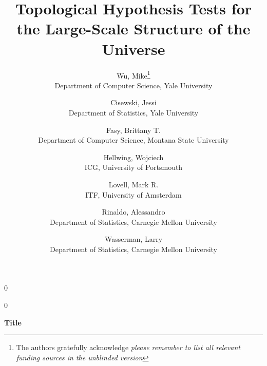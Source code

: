 \documentclass[12pt]{article}
\newcommand{\blind}{0}
\begin{document}
%

\def\spacingset#1{\renewcommand{\baselinestretch}%
{#1}\small\normalsize} \spacingset{1}



\blind
{
  \title{\bf Topological Hypothesis Tests for the Large-Scale Structure of the Universe}
  \author{Wu, Mike\thanks{
    The authors gratefully acknowledge \textit{please remember to list all relevant funding sources in the unblinded version}}\hspace{.2cm}\\
    Department of Computer Science, Yale University
    \and
    Cisewski, Jessi\\
    Department of Statistics, Yale University
    \and
    Fasy, Brittany T.\\
    Department of Computer Science, Montana State University
    \and
    Hellwing, Wojciech\\
    ICG, University of Portsmouth
    \and
    Lovell, Mark R.\\
    ITF, University of Amsterdam
    \and
    Rinaldo, Alessandro\\
    Department of Statistics, Carnegie Mellon University
    \and
    Wasserman, Larry\\
    Department of Statistics, Carnegie Mellon University
  }
  \maketitle
} \fi

\blind
{
  \bigskip
  \bigskip
  \bigskip
  \begin{center}
    {\LARGE\bf Title}
\end{center}
  \medskip
} \fi

\end{document}
